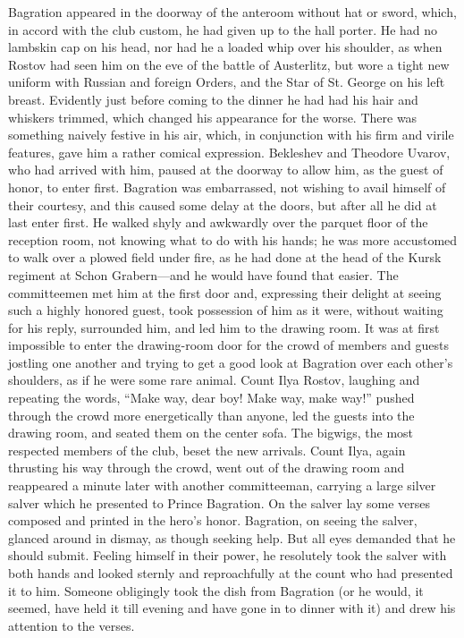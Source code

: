 Bagration appeared in the doorway of the anteroom without hat or
sword, which, in accord with the club custom, he had given up to
the hall porter. He had no lambskin cap on his head, nor had he a
loaded whip over his shoulder, as when Rostov had seen him on the
eve of the battle of Austerlitz, but wore a tight new uniform
with Russian and foreign Orders, and the Star of St. George on
his left breast. Evidently just before coming to the dinner he
had had his hair and whiskers trimmed, which changed his
appearance for the worse. There was something naively festive in
his air, which, in conjunction with his firm and virile features,
gave him a rather comical expression. Bekleshev and Theodore
Uvarov, who had arrived with him, paused at the doorway to allow
him, as the guest of honor, to enter first. Bagration was
embarrassed, not wishing to avail himself of their courtesy, and
this caused some delay at the doors, but after all he did at last
enter first. He walked shyly and awkwardly over the parquet floor
of the reception room, not knowing what to do with his hands; he
was more accustomed to walk over a plowed field under fire, as he
had done at the head of the Kursk regiment at Schon Grabern---and
he would have found that easier. The committeemen met him at the
first door and, expressing their delight at seeing such a highly
honored guest, took possession of him as it were, without waiting
for his reply, surrounded him, and led him to the drawing
room. It was at first impossible to enter the drawing-room door
for the crowd of members and guests jostling one another and
trying to get a good look at Bagration over each other's
shoulders, as if he were some rare animal.  Count Ilya Rostov,
laughing and repeating the words, ``Make way, dear boy! Make way,
make way!'' pushed through the crowd more energetically than
anyone, led the guests into the drawing room, and seated them on
the center sofa. The bigwigs, the most respected members of the
club, beset the new arrivals. Count Ilya, again thrusting his way
through the crowd, went out of the drawing room and reappeared a
minute later with another committeeman, carrying a large silver
salver which he presented to Prince Bagration. On the salver lay
some verses composed and printed in the hero's honor. Bagration,
on seeing the salver, glanced around in dismay, as though seeking
help. But all eyes demanded that he should submit. Feeling
himself in their power, he resolutely took the salver with both
hands and looked sternly and reproachfully at the count who had
presented it to him. Someone obligingly took the dish from
Bagration (or he would, it seemed, have held it till evening and
have gone in to dinner with it) and drew his attention to the
verses.

